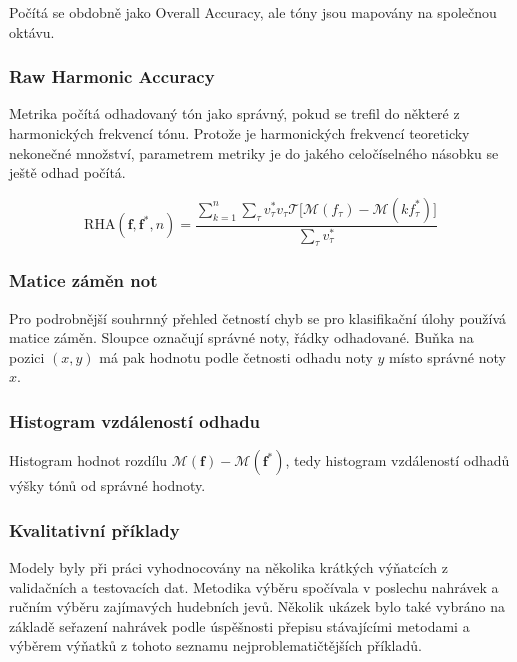Počítá se obdobně jako Overall Accuracy, ale tóny jsou mapovány na společnou oktávu.

\subsubsection{Raw Harmonic Accuracy}

Metrika počítá odhadovaný tón jako správný, pokud se trefil do některé z harmonických frekvencí tónu. Protože je harmonických frekvencí teoreticky nekonečné množství, parametrem metriky je do jakého celočíselného násobku se ještě odhad počítá.

    $$\mathrm{RHA}(\mathbf{f}, \mathbf{f^*}, n) = \frac{\sum_{k=1}^n \sum_\tau{v^*_\tau v_\tau \mathcal{T}[\mathcal{M}(f_\tau) - \mathcal{M}(k f^*_\tau)} ] }{\sum_\tau{v^*_\tau}}$$

\subsubsection{Matice záměn not}

Pro podrobnější souhrnný přehled četností chyb se pro klasifikační úlohy používá matice záměn. Sloupce označují správné noty, řádky odhadované. Buňka na pozici $(x,y)$ má pak hodnotu podle četnosti odhadu noty $y$ místo správné noty $x$.

\subsubsection{Histogram vzdáleností odhadu}

Histogram hodnot rozdílu $\mathcal{M}(\mathbf{f}) - \mathcal{M}(\mathbf{f^*})$, tedy histogram vzdáleností odhadů výšky tónů od správné hodnoty.


\subsubsection{Kvalitativní příklady}

Modely byly při práci vyhodnocovány na několika krátkých výňatcích z validačních a testovacích dat. Metodika výběru spočívala v poslechu nahrávek a ručním výběru zajímavých hudebních jevů. Několik ukázek bylo také vybráno na základě seřazení nahrávek podle úspěšnosti přepisu stávajícími metodami a výběrem výňatků z tohoto seznamu nejproblematičtějších příkladů.




